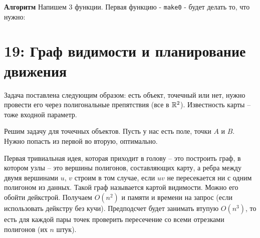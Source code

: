 \documentclass[11pt]{article}
\begin{document}
\textbf{Алгоритм}
Напишем 3 функции. Первая функцию - \texttt{make0} - будет делать то, что нужно:



\section{{\bfseries{}} 19: Граф видимости и планирование движения}
\label{sec:orgheadline49}
Задача поставлена следующим образом: есть объект, точечный или нет,
нужно провести его через полигональные препятствия (все в \(\mathbb{R}^2\)).
Известность карты -- тоже входной параметр.

Решим задачу для точечных объектов. Пусть у нас есть поле, точки \(A\)
и \(B\). Нужно попасть из первой во вторую, оптимально.

Первая тривиальная идея, которая приходит в голову -- это построить
граф, в котором узлы -- это вершины полигонов, составляющих карту, а
ребра между двумя вершинами \(u\), \(v\) строим в том случае, если \(uv\)
не пересекается ни с одним полигоном из данных. Такой граф
называется картой видимости. Можно его обойти дейкстрой. Получаем
\(O(n^2)\) и памяти и времени на запрос (если использовать дейкстру
без кучи). Предподсчет будет занимать втупую \(O(n^3)\), то есть для
каждой пары точек проверить пересечение со всеми отрезками полигонов
(их \(n\) штук).
\end{document}
